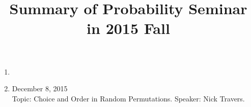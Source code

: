\documentclass{article}
\begin{document}
 

\title{Summary of Probability Seminar in 2015 Fall} 

\maketitle


\begin{enumerate} 


\item 


\item  December 8, 2015 \\
Topic: Choice and Order in Random Permutations.  Speaker: Nick Travers. 


\end{enumerate}
\end{document}
